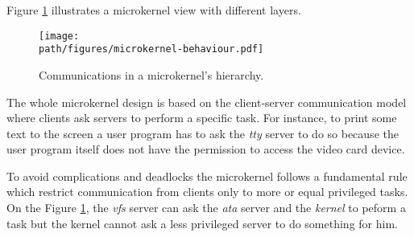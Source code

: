 Figure \ref{figure:microkernel} illustrates a microkernel view with different
layers.

\begin{figure}[h]
  \begin{center}
    \texttt{[image: \\path/figures/microkernel-behaviour.pdf]}
    \caption{Communications in a microkernel's hierarchy.}
    \label{figure:microkernel}
  \end{center}
\end{figure}

The whole microkernel design is based on the client-server communication
model where clients ask servers to perform a specific task. For instance,
to print some text to the screen a user program has to ask the \textit{tty}
server to do so because the user program itself does not have the permission
to access the video card device.

To avoid complications and deadlocks the microkernel follows a fundamental
rule which restrict communication from clients only to more or equal
privileged tasks. On the Figure \ref{figure:microkernel}, the \textit{vfs}
server can ask the \textit{ata} server and the \textit{kernel} to peform a
task but the kernel cannot ask a less privileged server to do something for
him.
